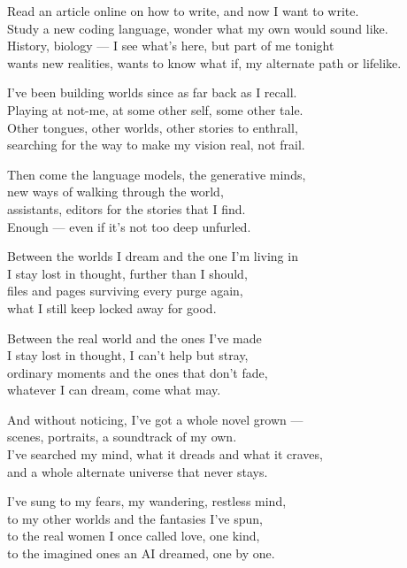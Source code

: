 \begin{lyrics}
Read an article online on how to write, and now I want to write.\\
Study a new coding language, wonder what my own would sound like.\\
History, biology — I see what's here, but part of me tonight\\
wants new realities, wants to know what if, my alternate path or lifelike.

I've been building worlds since as far back as I recall.\\
Playing at not-me, at some other self, some other tale.\\
Other tongues, other worlds, other stories to enthrall,\\
searching for the way to make my vision real, not frail.

Then come the language models, the generative minds,\\
new ways of walking through the world,\\
assistants, editors for the stories that I find.\\
Enough — even if it's not too deep unfurled.

Between the worlds I dream and the one I'm living in\\
I stay lost in thought, further than I should,\\
files and pages surviving every purge again,\\
what I still keep locked away for good.

Between the real world and the ones I've made\\
I stay lost in thought, I can't help but stray,\\
ordinary moments and the ones that don't fade,\\
whatever I can dream, come what may.

And without noticing, I've got a whole novel grown —\\
scenes, portraits, a soundtrack of my own.\\
I've searched my mind, what it dreads and what it craves,\\
and a whole alternate universe that never stays.

I've sung to my fears, my wandering, restless mind,\\
to my other worlds and the fantasies I've spun,\\
to the real women I once called love, one kind,\\
to the imagined ones an AI dreamed, one by one.


\end{lyrics}
